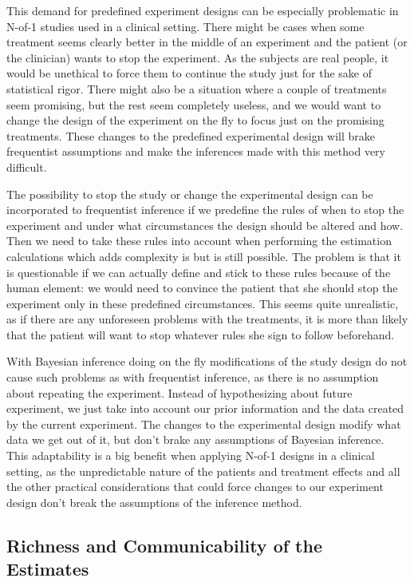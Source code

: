 \documentclass[12pt,a4paper,leqno]{report}
\theoremstyle{plain}
\theoremstyle{definition}
\theoremstyle{remark}
\begin{document}
This demand for predefined experiment designs can be especially problematic in N-of-1 studies
used in a clinical setting. There might be cases when some treatment seems
clearly better in the middle of an experiment and the patient (or the clinician)
wants to stop the experiment. As the subjects are real people, it would be
unethical to force them to continue the study just for the sake of statistical
rigor. There might also be a situation where a couple of treatments seem
promising, but the rest seem completely useless, and we would want to change the
design of the experiment on the fly to focus just on the promising treatments.
These changes to the predefined experimental design will brake frequentist
assumptions and make the inferences made with this method very difficult.

The possibility to stop the study or change the experimental design can be
incorporated to frequentist inference if we predefine the rules of when to
stop the experiment and under what circumstances the design should be altered
and how. Then we need to take these rules into account when performing the estimation
calculations which adds complexity is but is still possible. The problem is that it is questionable if we can actually
define and stick to these rules because of the human element: we would need to convince the patient that she should stop the experiment only in these predefined circumstances. This seems quite
unrealistic, as if there are any unforeseen problems with the treatments, it is
more than likely that the patient will want to stop whatever rules she sign to follow
beforehand.

With Bayesian inference doing on the fly modifications of the study design do not
cause such problems as with frequentist inference, as there is no assumption
about repeating the experiment. Instead of hypothesizing about future
experiment, we just take into account our prior information and the data created by
the current experiment. The changes to the experimental design modify what data
we get out of it, but don't brake any assumptions of Bayesian inference. This
adaptability is a big benefit when applying N-of-1 designs in a clinical setting, as
the unpredictable nature of the patients and treatment effects and all the other
practical considerations that could force changes to our experiment design don't
break the assumptions of the inference method.

\subsection{Richness and Communicability of the Estimates}\label{whybayes}
\end{document}
